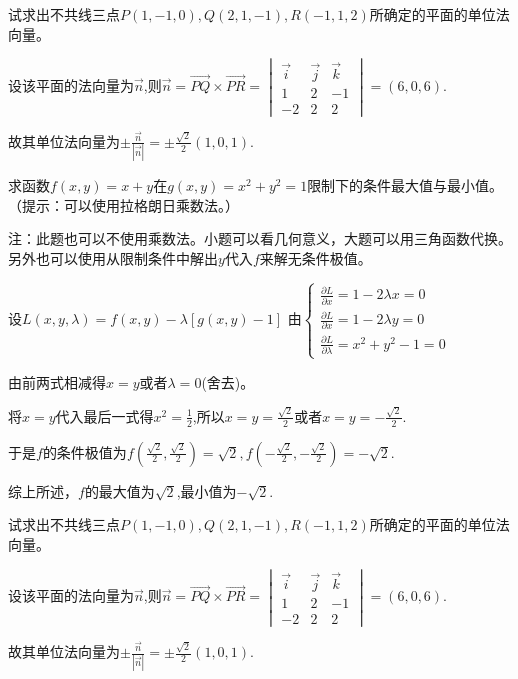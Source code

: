\documentclass[twoside,12pt]{hnuexam}
\begin{document}
\begin{questions}
	\question
		试求出不共线三点$P(1,-1,0),Q(2,1,-1),R(-1,1,2)$所确定的平面的单位法向量。
		\begin{solution}
			设该平面的法向量为$\vec{n}$,则$\vec{n}=\vec{PQ}\times\vec{PR}=\begin{vmatrix}
					\vec{i} & \vec{j} & \vec{k} \\
					1       & 2       & -1      \\
					-2      & 2       & 2
				\end{vmatrix}=(6,0,6).$
	
			故其单位法向量为$\pm\frac{\vec{n}}{|\vec{n}|}=\pm\frac{\sqrt{2}}{2}(1,0,1).$
		\end{solution}
		\vspace*{\stretch{1}}
	\clearpage

	\question
	求函数$f(x,y)=x+y$在$g(x,y)=x^2+y^2=1$限制下的条件最大值与最小值。（提示：可以使用拉格朗日乘数法。）
	\begin{solution}
		注：此题也可以不使用乘数法。小题可以看几何意义，大题可以用三角函数代换。另外也可以使用从限制条件中解出$y$代入$f$来解无条件极值。

		设$L(x,y,\lambda)=f(x,y)-\lambda [g(x,y)-1]$
		由$\begin{cases}
				\frac{\partial L}{\partial x}=1-2\lambda x=0 \\
				\frac{\partial L}{\partial x}=1-2\lambda y=0 \\
				\frac{\partial L}{\partial \lambda}=x^2+y^2-1=0
			\end{cases}$\score{4}

		由前两式相减得$x=y$或者$\lambda=0$(舍去)。\score{5}

		将$x=y$代入最后一式得$x^2=\frac{1}{2}$,所以$x=y=\frac{\sqrt{2}}{2}$或者$x=y=-\frac{\sqrt{2}}{2}$.\score{7}

		于是$f$的条件极值为$f(\frac{\sqrt{2}}{2},\frac{\sqrt{2}}{2})=\sqrt{2},f(-\frac{\sqrt{2}}{2},-\frac{\sqrt{2}}{2})=-\sqrt{2}.$\score{9}

		综上所述，$f$的最大值为$\sqrt{2}$,最小值为$-\sqrt{2}.$\score{10}
	\end{solution}

	\question
		试求出不共线三点$P(1,-1,0),Q(2,1,-1),R(-1,1,2)$所确定的平面的单位法向量。
		\begin{solution}
			设该平面的法向量为$\vec{n}$,则$\vec{n}=\vec{PQ}\times\vec{PR}=\begin{vmatrix}
					\vec{i} & \vec{j} & \vec{k} \\
					1       & 2       & -1      \\
					-2      & 2       & 2
				\end{vmatrix}=(6,0,6).$\score{2+5}
	
			故其单位法向量为$\pm\frac{\vec{n}}{|\vec{n}|}=\pm\frac{\sqrt{2}}{2}(1,0,1).$
		\end{solution}
\end{questions}
\end{document}
